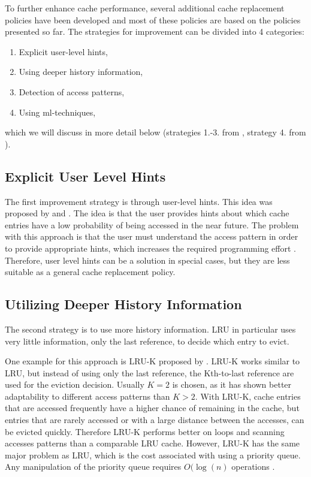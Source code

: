\documentclass[
	12pt,
	a4paper,
	abstract,
	bibliography=totoc,
	chapterprefix,
	headings=openright,
	numbers=endperiod,
	parskip=half,
	twoside,
]{scrreprt}
\begin{document}
To further enhance cache performance, several additional cache replacement policies have been developed and
most of these policies are based on the policies presented so far.
The strategies for improvement can be divided into 4 categories:

\begin{enumerate}
	\setlength\itemsep{-0.8em}
	\item Explicit user-level hints,
	\item Using deeper history information,
	\item Detection of access patterns,
	\item Using ml-techniques,
\end{enumerate}

which we will discuss in more detail below 
(strategies 1.-3. from \cite{10.1145/511399.511340}, strategy 4. from \cite{rodriguez2021learning}).


\subsection{Explicit User Level Hints}

The first improvement strategy is through user-level hints.
This idea was proposed by \cite{cao1994application} and \cite{patterson1995informed}.
The idea is that the user provides hints about which cache entries have a low probability of being accessed in the near future.
The problem with this approach is that the user must understand the access pattern in order to provide appropriate hints, which increases 
the required programming effort \cite{10.1145/511399.511340}.
Therefore, user level hints can be a solution in special cases,
but they are less suitable as a general cache replacement policy.

\subsection{Utilizing Deeper History Information}

The second strategy is to use more history information.
LRU in particular uses very little information, only the last reference, to decide which entry to evict.

One example for this approach is LRU-K proposed by \cite{o1993lru}.
LRU-K works similar to LRU, but instead of using only the last reference,
the Kth-to-last reference are used for the eviction decision. 
Usually $K = 2$ is chosen, as it has shown better adaptability to different access patterns than $K > 2$.
With LRU-K, cache entries that are accessed frequently have a higher chance of remaining in the cache, but 
entries that are rarely accessed or with a large distance between the accesses, can be evicted quickly.
Therefore LRU-K performs better on loops and scanning accesses patterns than a comparable LRU cache. 
However, LRU-K has the same major problem as LRU, which is the cost associated with using a priority queue.
Any manipulation of the priority queue requires $O(\log(n)$ operations \cite{10.1145/511399.511340}.
\end{document}
